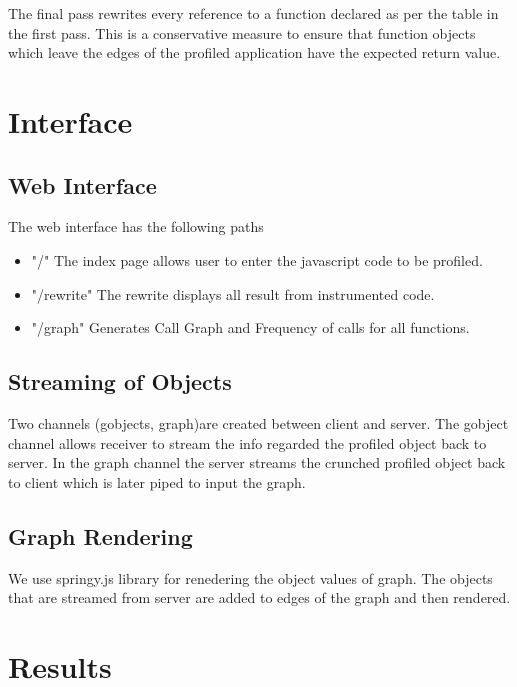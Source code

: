 \documentclass{article}
\begin{document}
The final pass rewrites every reference to a function declared as per the table in the first pass. This is a conservative measure to ensure that function objects which leave the edges of the profiled application have the expected return value.

\section{Interface}

\subsection{Web Interface}

The web interface has the following paths 
\begin{itemize}
\item  "/" The index page allows user to enter the javascript code to be profiled.
\item  "/rewrite" The rewrite displays all result from instrumented code.
\item "/graph"  Generates Call Graph and Frequency of calls for all functions.
\end{itemize}


\subsection{Streaming of Objects}

Two channels (gobjects, graph)are created between client and server. 
The gobject channel allows receiver to stream the info regarded the profiled object 
back to server. In the graph channel the server streams the crunched profiled object back
to client which is later piped to input the graph.


\subsection{Graph Rendering}

We use springy.js library for renedering the  object values of graph.
The objects that are streamed from server are added to edges of the graph and then rendered.

\section{Results}
\end{document}
